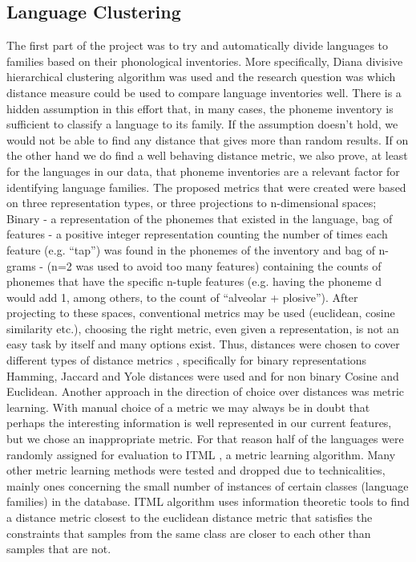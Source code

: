 \documentclass[letterpaper, 11pt]{article}
\begin{document}
\subsection*{Language Clustering}
The first part of the project was to try and automatically divide languages to families based on their phonological inventories. More specifically, Diana \cite{patnaik2016divisive} divisive hierarchical clustering algorithm was used and the research question was which distance measure could be used to compare language inventories well. There is a hidden assumption in this effort that, in many cases, the phoneme inventory is sufficient to classify a language to its family. If the assumption doesn't hold, we would not be able to find any distance that gives more than random results. If on the other hand we do find a well behaving distance metric, we also prove, at least for the languages in our data, that phoneme inventories are a relevant factor  for identifying language families. The proposed metrics that were created were based on three representation types, or three projections to n-dimensional spaces; Binary - a representation of the phonemes that existed in the language, bag of features - a positive integer representation counting the number of times each feature (e.g. “tap”) was found in the phonemes of the inventory and bag of n-grams - (n=2 was used to avoid too many features) containing the counts of phonemes that have the specific n-tuple features (e.g. having the phoneme d would add 1, among others, to the count of “alveolar + plosive”). After projecting to these spaces, conventional metrics may be used (euclidean, cosine similarity etc.), choosing the right metric, even given a representation, is not an easy task by itself and many options exist. Thus, distances were chosen to cover different types of distance metrics \cite{cha2007comprehensive,choi2010survey}, specifically for binary representations Hamming, Jaccard and Yole distances were used and for non binary Cosine and Euclidean.
Another approach in the direction of choice over distances was metric learning. With manual choice of a metric we may always be in doubt that perhaps the interesting information is well represented in our current features, but we chose an inappropriate metric. For that reason half of the languages were randomly assigned for evaluation to ITML \cite{davis2007information}, a metric learning algorithm. Many other metric learning methods \cite{shental2002adjustment} were tested and dropped due to technicalities, mainly ones concerning the small number of instances of certain classes (language families) in the database. ITML algorithm uses information theoretic tools to find a distance metric closest to the euclidean distance metric that satisfies the constraints that samples from the same class are closer to each other than samples that are not.
\end{document}
